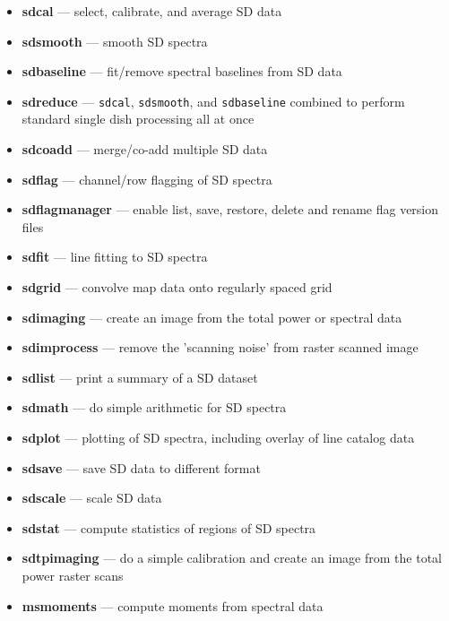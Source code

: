 \begin{itemize}

\item {\bf sdcal} --- select, calibrate, and average SD data

\item {\bf sdsmooth} --- smooth SD spectra

\item {\bf sdbaseline} --- fit/remove spectral baselines from SD data

\item {\bf sdreduce} --- {\tt sdcal}, {\tt sdsmooth}, and {\tt sdbaseline} combined to perform standard single dish processing all at once 

\item {\bf sdcoadd} --- merge/co-add multiple SD data

\item {\bf sdflag} --- channel/row flagging of SD spectra

\item {\bf sdflagmanager} --- enable list, save, restore, delete and rename flag version files

\item {\bf sdfit} --- line fitting to SD spectra

\item {\bf sdgrid} --- convolve map data onto regularly spaced grid

\item {\bf sdimaging} --- create an image from the total power or spectral data

\item{\bf sdimprocess} --- remove the 'scanning noise' from raster scanned image  

\item {\bf sdlist} --- print a summary of a SD dataset

\item {\bf sdmath} --- do simple arithmetic for SD spectra 

\item {\bf sdplot} --- plotting of SD spectra, including overlay of line
catalog data

\item {\bf sdsave} --- save SD data to different format

\item {\bf sdscale} --- scale SD data
 
\item {\bf sdstat} --- compute statistics of regions of SD spectra

\item {\bf sdtpimaging} --- do a simple calibration and create an image from the total power raster scans
 
\item{\bf msmoments} --- compute moments from spectral data

\end{itemize}

